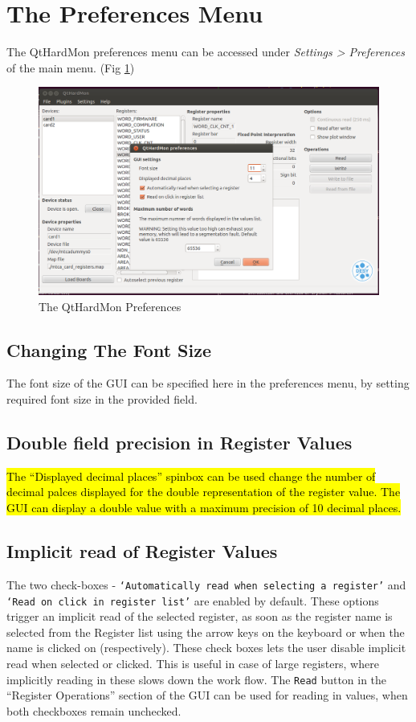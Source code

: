 \section{The Preferences Menu}\label{preference_section} 
The QtHardMon preferences menu can be accessed under 
\textit{Settings > Preferences} of the main menu. (Fig \ref{qthardmon_preferences})

\begin{figure}[htbp] 
	\centering
    \includegraphics[width=1\textwidth]{images/preferences.png} \caption{The
    QtHardMon Preferences} \label{qthardmon_preferences}			\end{figure}

\subsection{Changing The Font Size} 
The font size of the GUI can be specified here in the preferences menu, 
by setting required font size in the provided field.

\subsection{Double field precision in Register Values}
\hl{The ``Displayed decimal places'' spinbox can be used change the number of 
decimal palces displayed for the double representation of the register value.
The GUI can display a double value with a maximum precision of 10 decimal places.}


\subsection{Implicit read of Register Values}\label{sub::imp_read} 
The two check-boxes - \texttt{`Automatically read when selecting a register'} 
and \texttt{`Read on click in register list'} are enabled by default. 
These options trigger an implicit read of the selected register, as 
soon as the register name is selected from the Register list using the arrow 
keys on the keyboard or when the name is clicked on (respectively). These 
check boxes lets the user disable implicit read when selected or clicked. 
This is useful in case of large registers, where implicitly reading in 
these slows down the work flow. The \texttt{Read} button in the 
``Register Operations'' section of the GUI can be used for reading in values, when 
both checkboxes remain unchecked.

